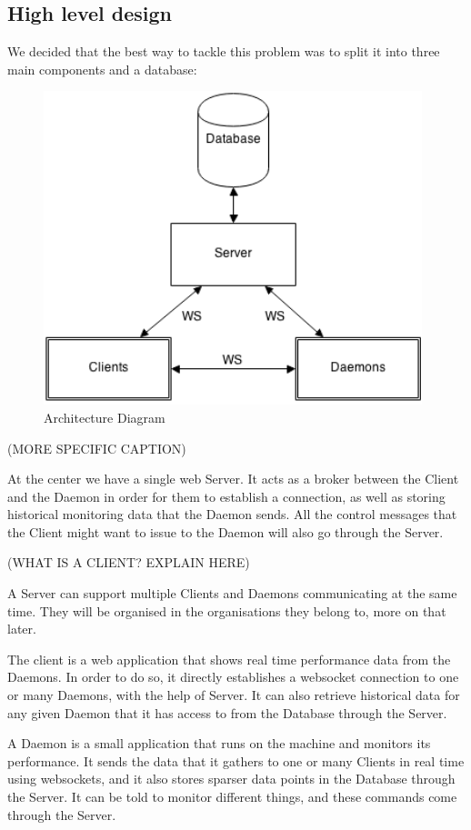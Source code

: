 \documentclass{l3proj}
\begin{document}
\subsection{High level design}

We decided that the best way to tackle this problem was to split it into three main components and a database:

\begin{figure}[H]
\centering
\includegraphics[width=110mm]{images/ArchitectureDiagram.png}
\caption{Architecture Diagram}
\end{figure}

(MORE SPECIFIC CAPTION)

At the center we have a single web Server. It acts as a broker between the Client and the Daemon in order for them to establish a connection, as well as storing historical monitoring data that the Daemon sends. All the control messages that the Client might want to issue to the Daemon will also go through the Server.

(WHAT IS A CLIENT? EXPLAIN HERE)

A Server can support multiple Clients and Daemons communicating at the same time. They will be organised in the organisations they belong to, more on that later.

The client is a web application that shows real time performance data from the Daemons. In order to do so, it directly establishes a websocket connection to one or many Daemons, with the help of Server. It can also retrieve historical data for any given Daemon that it has access to from the Database through the Server.

A Daemon is a small application that runs on the machine and monitors its performance. It sends the data that it gathers to one or many Clients in real time using websockets, and it also stores sparser data points in the Database through the Server. It can be told to monitor different things, and these commands come through the Server.
\end{document}

